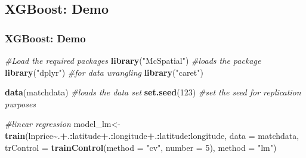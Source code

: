 \documentclass[
  shownotes,
  xcolor={svgnames},
  hyperref={colorlinks,citecolor=DarkBlue,linkcolor=DarkRed,urlcolor=DarkBlue}
  , aspectratio=169]{beamer}
\newenvironment{Shaded}{\begin{snugshade}}{\end{snugshade}}
\newcommand{\CommentTok}[1]{\textcolor[rgb]{0.56,0.35,0.01}{\textit{#1}}}
\newcommand{\DataTypeTok}[1]{\textcolor[rgb]{0.13,0.29,0.53}{#1}}
\newcommand{\DecValTok}[1]{\textcolor[rgb]{0.00,0.00,0.81}{#1}}
\newcommand{\KeywordTok}[1]{\textcolor[rgb]{0.13,0.29,0.53}{\textbf{#1}}}
\newcommand{\NormalTok}[1]{#1}
\newcommand{\OperatorTok}[1]{\textcolor[rgb]{0.81,0.36,0.00}{\textbf{#1}}}
\newcommand{\StringTok}[1]{\textcolor[rgb]{0.31,0.60,0.02}{#1}}
\begin{document}
\subsection{XGBoost: Demo}
\begin{frame}[fragile]
\frametitle{XGBoost: Demo}



\begin{Shaded}
\begin{Highlighting}[]
\CommentTok{\#Load the required packages}
\KeywordTok{library}\NormalTok{(}\StringTok{"McSpatial"}\NormalTok{) }\CommentTok{\#loads the package}
\KeywordTok{library}\NormalTok{(}\StringTok{"dplyr"}\NormalTok{) }\CommentTok{\#for data wrangling}
\KeywordTok{library}\NormalTok{(}\StringTok{"caret"}\NormalTok{)}

\KeywordTok{data}\NormalTok{(matchdata) }\CommentTok{\#loads the data set}
\KeywordTok{set.seed}\NormalTok{(}\DecValTok{123}\NormalTok{) }\CommentTok{\#set the seed for replication purposes}
\end{Highlighting}
\end{Shaded}

\begin{Shaded}
\begin{Highlighting}[]
\CommentTok{\#linear regression}
\NormalTok{model\_lm\textless{}{-}}\KeywordTok{train}\NormalTok{(lnprice}\OperatorTok{\textasciitilde{}}\NormalTok{.}\OperatorTok{+}\NormalTok{.}\OperatorTok{:}\NormalTok{latitude}\OperatorTok{+}\NormalTok{.}\OperatorTok{:}\NormalTok{longitude}\OperatorTok{+}\NormalTok{.}\OperatorTok{:}\NormalTok{latitude}\OperatorTok{:}\NormalTok{longitude,  }
                     \DataTypeTok{data =}\NormalTok{ matchdata,}
                     \DataTypeTok{trControl =} \KeywordTok{trainControl}\NormalTok{(}\DataTypeTok{method =} \StringTok{"cv"}\NormalTok{, }\DataTypeTok{number =} \DecValTok{5}\NormalTok{), }
                     \DataTypeTok{method =} \StringTok{"lm"}\NormalTok{)    }
\end{Highlighting}
\end{Shaded}

\end{frame}
\end{document}
